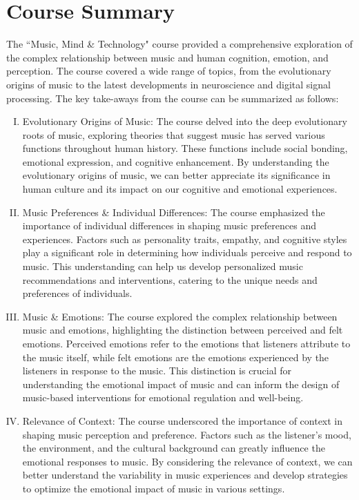\documentclass[conference]{IEEEtran}
\begin{document}
\section{Course Summary}
The ``Music, Mind \& Technology" course provided a comprehensive exploration of the complex relationship between music and human cognition, emotion, and perception. The course covered a wide range of topics, from the evolutionary origins of music to the latest developments in neuroscience and digital signal processing. The key take-aways from the course can be summarized as follows:
\begin{enumerate}[I.]

\item Evolutionary Origins of Music: The course delved into the deep evolutionary roots of music, exploring theories that suggest music has served various functions throughout human history. These functions include social bonding, emotional expression, and cognitive enhancement. By understanding the evolutionary origins of music, we can better appreciate its significance in human culture and its impact on our cognitive and emotional experiences.

\item Music Preferences \& Individual Differences: The course emphasized the importance of individual differences in shaping music preferences and experiences. Factors such as personality traits, empathy, and cognitive styles play a significant role in determining how individuals perceive and respond to music. This understanding can help us develop personalized music recommendations and interventions, catering to the unique needs and preferences of individuals.

\item Music \& Emotions: The course explored the complex relationship between music and emotions, highlighting the distinction between perceived and felt emotions. Perceived emotions refer to the emotions that listeners attribute to the music itself, while felt emotions are the emotions experienced by the listeners in response to the music. This distinction is crucial for understanding the emotional impact of music and can inform the design of music-based interventions for emotional regulation and well-being.

\item Relevance of Context: The course underscored the importance of context in shaping music perception and preference. Factors such as the listener's mood, the environment, and the cultural background can greatly influence the emotional responses to music. By considering the relevance of context, we can better understand the variability in music experiences and develop strategies to optimize the emotional impact of music in various settings.


\end{enumerate}
\end{document}
